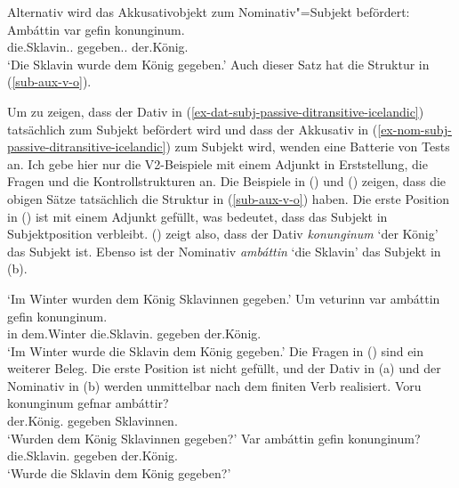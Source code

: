 Alternativ wird das Akkusativobjekt zum Nominativ"=Subjekt befördert:
\ea
\label{ex-nom-subj-passive-ditransitive-icelandic}
\gll Ambáttin var gefin konunginum.\\
     die.Sklavin.\NOM.\SG{} \AUX{} gegeben.\F.\SG{} der.König.\DAT\\\icelandic
\glt `Die Sklavin wurde dem König gegeben.'
\z
Auch dieser Satz hat die Struktur in (\ref{sub-aux-v-o}).

Um zu zeigen, dass der Dativ in
(\ref{ex-dat-subj-passive-ditransitive-icelandic}) tatsächlich zum Subjekt befördert wird und dass der Akkusativ in
(\ref{ex-nom-subj-passive-ditransitive-icelandic}) zum Subjekt wird, wenden \citet*[]{ZMT85a} eine Batterie von
Tests an. Ich gebe hier nur die V2-Beispiele mit einem Adjunkt in Erststellung, die Fragen und die
Kontrollstrukturen an. Die Beispiele in () und () zeigen, dass die obigen Sätze
tatsächlich die Struktur in (\ref{sub-aux-v-o}) haben. Die erste Position in () ist mit einem
Adjunkt gefüllt, was bedeutet, dass das Subjekt in Subjektposition verbleibt. () zeigt also, dass der Dativ
\emph{konunginum} `der König' das Subjekt ist. Ebenso ist der Nominativ \emph{ambáttin} `die
Sklavin' das Subjekt in (b).

\eal
\ex
{}
\glt `Im Winter wurden dem König Sklavinnen gegeben.'
\ex
\gll Um veturinn var ambáttin gefin konunginum.\\
     in dem.Winter \AUX{} die.Sklavin.\NOM{} gegeben der.König.\NOM\\
\glt `Im Winter wurde die Sklavin dem König gegeben.'
\zl
Die Fragen in () sind ein weiterer Beleg. Die erste Position ist nicht gefüllt, und der Dativ
in (a) und der Nominativ in (b) werden unmittelbar nach dem finiten Verb realisiert.
\eal
\ex\label{ex-were-the-king-given-the-slaves}
\gll Voru konunginum gefnar ambáttir?\\
     \AUX{} der.König.\DAT{} gegeben Sklavinnen.\NOM{}\\\icelandic
\glt `Wurden dem König Sklavinnen gegeben?'
\ex\label{ex-were-the-slaves-given-the-king}
\gll Var ambáttin gefin konunginum?\\
     \AUX{} die.Sklavin.\NOM{} gegeben der.König.\DAT\\
\glt `Wurde die Sklavin dem König gegeben?'
\zl

